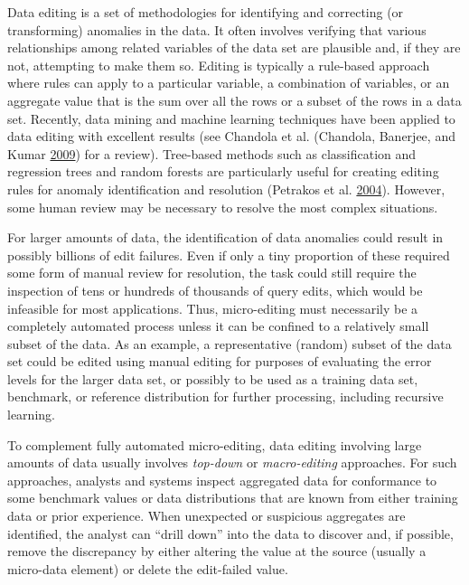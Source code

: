 \documentclass[]{krantz}
\begin{document}
Data editing is a set of methodologies for identifying and correcting
(or transforming) anomalies in the data. It often involves verifying
that various relationships among related variables of the data set are
plausible and, if they are not, attempting to make them so. Editing is
typically a rule-based approach where rules can apply to a particular
variable, a combination of variables, or an aggregate value that is the
sum over all the rows or a subset of the rows in a data set. Recently,
data mining and machine learning techniques have been applied to data
editing with excellent results (see Chandola et al. (Chandola, Banerjee,
and Kumar \protect\hyperlink{ref-chandola2009anomaly}{2009}) for a
review). Tree-based methods such as classification and regression trees
and random forests are particularly useful for creating editing rules
for anomaly identification and resolution (Petrakos et al.
\protect\hyperlink{ref-petrakos2004new}{2004}). However, some human
review may be necessary to resolve the most complex situations.

For larger amounts of data, the identification of data anomalies could
result in possibly billions of edit failures. Even if only a tiny
proportion of these required some form of manual review for resolution,
the task could still require the inspection of tens or hundreds of
thousands of query edits, which would be infeasible for most
applications. Thus, micro-editing must necessarily be a completely
automated process unless it can be confined to a relatively small subset
of the data. As an example, a representative (random) subset of the data
set could be edited using manual editing for purposes of evaluating the
error levels for the larger data set, or possibly to be used as a
training data set, benchmark, or reference distribution for further
processing, including recursive learning.

To complement fully automated micro-editing, data editing involving
large amounts of data usually involves \emph{top-down} or
\emph{macro-editing} approaches. For such approaches, analysts and
systems inspect aggregated data for conformance to some benchmark values
or data distributions that are known from either training data or prior
experience. When unexpected or suspicious aggregates are identified, the
analyst can ``drill down'' into the data to discover and, if possible,
remove the discrepancy by either altering the value at the source
(usually a micro-data element) or delete the edit-failed value.
\end{document}
